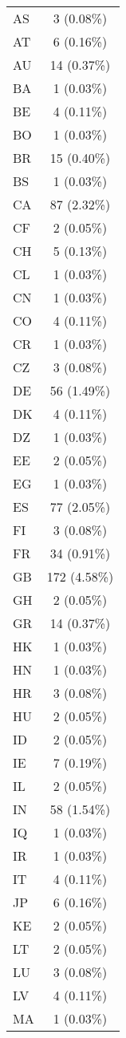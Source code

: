 \documentclass[
]{article}
\begin{document}
\begin{longtable}[]{@{}lc@{}}
AS & 3 (0.08\%) \\
AT & 6 (0.16\%) \\
AU & 14 (0.37\%) \\
BA & 1 (0.03\%) \\
BE & 4 (0.11\%) \\
BO & 1 (0.03\%) \\
BR & 15 (0.40\%) \\
BS & 1 (0.03\%) \\
CA & 87 (2.32\%) \\
CF & 2 (0.05\%) \\
CH & 5 (0.13\%) \\
CL & 1 (0.03\%) \\
CN & 1 (0.03\%) \\
CO & 4 (0.11\%) \\
CR & 1 (0.03\%) \\
CZ & 3 (0.08\%) \\
DE & 56 (1.49\%) \\
DK & 4 (0.11\%) \\
DZ & 1 (0.03\%) \\
EE & 2 (0.05\%) \\
EG & 1 (0.03\%) \\
ES & 77 (2.05\%) \\
FI & 3 (0.08\%) \\
FR & 34 (0.91\%) \\
GB & 172 (4.58\%) \\
GH & 2 (0.05\%) \\
GR & 14 (0.37\%) \\
HK & 1 (0.03\%) \\
HN & 1 (0.03\%) \\
HR & 3 (0.08\%) \\
HU & 2 (0.05\%) \\
ID & 2 (0.05\%) \\
IE & 7 (0.19\%) \\
IL & 2 (0.05\%) \\
IN & 58 (1.54\%) \\
IQ & 1 (0.03\%) \\
IR & 1 (0.03\%) \\
IT & 4 (0.11\%) \\
JP & 6 (0.16\%) \\
KE & 2 (0.05\%) \\
LT & 2 (0.05\%) \\
LU & 3 (0.08\%) \\
LV & 4 (0.11\%) \\
MA & 1 (0.03\%) \\

\end{longtable}
\end{document}
